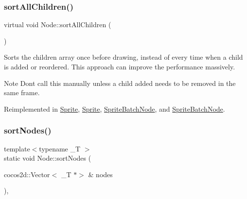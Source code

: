 \mbox{\label{classNode_a5911e98e2230b164daf283f707e1748d}} 
\subsubsection{\texorpdfstring{sort\+All\+Children()}{sortAllChildren()}\hspace{0.1cm}{\footnotesize\ttfamily [2/2]}}
{\footnotesize\ttfamily virtual void Node\+::sort\+All\+Children (\begin{DoxyParamCaption}{ }\end{DoxyParamCaption})\hspace{0.3cm}{\ttfamily [virtual]}}

Sorts the children array once before drawing, instead of every time when a child is added or reordered. This approach can improve the performance massively. \begin{DoxyNote}{Note}
Don\textquotesingle{}t call this manually unless a child added needs to be removed in the same frame. 
\end{DoxyNote}


Reimplemented in \hyperlink{classSprite_ae3553d2d41b7c9fb764fc0ca1b41ef86}{Sprite}, \hyperlink{classSprite_adf75ebee22c9ff3f4d72f99c86ff365c}{Sprite}, \hyperlink{classSpriteBatchNode_a939e68291147526d7d452a310b59b0b7}{Sprite\+Batch\+Node}, and \hyperlink{classSpriteBatchNode_af2a850d2c664d2fd1a796601129a0413}{Sprite\+Batch\+Node}.

\mbox{\label{classNode_a17a2149cbfe0819a11f3e109cc67645c}} 
\subsubsection{\texorpdfstring{sort\+Nodes()}{sortNodes()}\hspace{0.1cm}{\footnotesize\ttfamily [1/2]}}
{\footnotesize\ttfamily template$<$typename \+\_\+T $>$ \\
static void Node\+::sort\+Nodes (\begin{DoxyParamCaption}\item[{cocos2d\+::\+Vector$<$ \+\_\+T $\ast$$>$ \&}]{nodes }\end{DoxyParamCaption})\hspace{0.3cm}{\ttfamily [inline]}, {\ttfamily [static]}}

